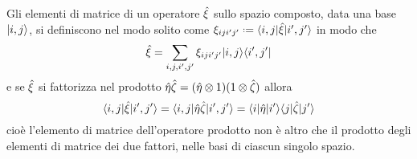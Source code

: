 Gli elementi di matrice di un operatore $\hat{\xi}$ sullo spazio composto, data una base $\lvert i,j\rangle$, si definiscono nel modo solito come $\xi_{iji'j'}\defeq\bra{i,j}\op\xi\ket{i',j'}$ in modo che
\begin{equation}
	\hat{\xi}=\sum_{i,j,i',j'}\xi_{iji'j'}\lvert i,j\rangle\langle i',j'\rvert
\end{equation}
e se $\hat{\xi}$ si fattorizza nel prodotto $\hat{\eta}\hat{\zeta}=(\hat{\eta}\otimes 1)(1\otimes\hat{\zeta})$ allora
\begin{equation}
	\langle i,j\rvert\hat{\xi}\lvert i',j'\rangle=\langle i,j\rvert\hat{\eta}\hat{\zeta}\lvert i',j'\rangle=\langle i\rvert\hat{\eta}\lvert i'\rangle\langle j\rvert\hat{\zeta}\lvert j'\rangle
\end{equation}
cioè l'elemento di matrice dell'operatore prodotto non è altro che il prodotto degli elementi di matrice dei due fattori, nelle basi di ciascun singolo spazio.

